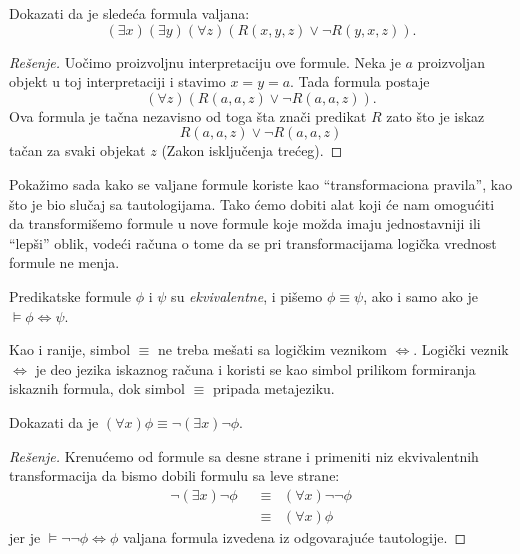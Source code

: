 \begin{EX}
  Dokazati da je slede\'ca formula valjana:
  $$
    (\exists x)(\exists y)(\forall z)(R(x, y, z) \lor \lnot R(y, x, z)).
  $$
\end{EX}
\begin{proof}[Re\v senje]
  Uo\v cimo proizvoljnu interpretaciju ove formule.
  Neka je $a$ proizvoljan objekt u toj interpretaciji i stavimo $x = y = a$. Tada formula postaje
  $$
    (\forall z)(R(a, a, z) \lor \lnot R(a, a, z)).
  $$
  Ova formula je ta\v cna nezavisno od toga \v sta zna\v ci predikat $R$ zato \v sto je iskaz
  $$
    R(a, a, z) \lor \lnot R(a, a, z)
  $$
  ta\v can za svaki objekat $z$ (Zakon isklju\v cenja tre\'ceg).
\end{proof}

Poka\v zimo sada kako se valjane formule koriste kao \enquote{transformaciona pravila}, kao \v sto je bio
slu\v caj sa tautologijama. Tako \'cemo dobiti alat koji \'ce nam omogu\'citi da transformi\v semo formule
u nove formule koje mo\v zda imaju jednostavniji ili \enquote{lep\v si} oblik, vode\'ci ra\v cuna o tome
da se pri transformacijama logi\v cka vrednost formule ne menja.

\ifBIOINF\else
    \begin{DEF}
      Predikatske formule $\phi$ i $\psi$ su \emph{ekvivalentne}, i pi\v semo $\phi \equiv \psi$, ako i samo ako je
      $\vDash \phi \Leftrightarrow \psi$.
    \end{DEF}
\fi 

Kao i ranije, simbol $\equiv$ ne treba me\v sati sa logi\v ckim veznikom $\Leftrightarrow$. Logi\v cki veznik
$\Leftrightarrow$ je deo jezika iskaznog ra\v cuna i koristi se kao simbol prilikom formiranja iskaznih formula, dok
simbol $\equiv$ pripada metajeziku.

\begin{EX}
  Dokazati da je $(\forall x)\phi \equiv \lnot (\exists x) \lnot \phi$.
\end{EX}
\begin{proof}[Re\v senje]
  Krenu\'cemo od formule sa desne strane i primeniti niz ekvivalentnih transformacija da bismo dobili formulu sa leve strane:
  \begin{align*}
    \lnot (\exists x) \lnot \phi
    &\;\;\equiv\;\; (\forall x) \lnot \lnot \phi\\
    &\;\;\equiv\;\; (\forall x) \phi
  \end{align*}
  jer je $\vDash \lnot \lnot \phi \Leftrightarrow \phi$ valjana formula izvedena iz odgovaraju\'ce tautologije.
\end{proof}

